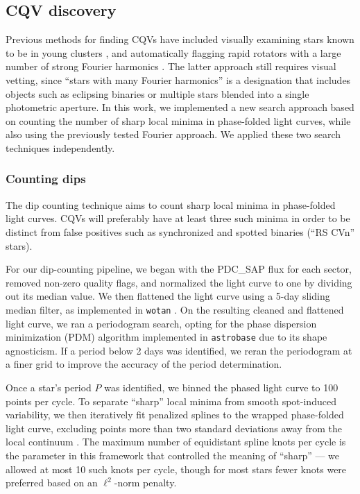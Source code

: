 \documentclass[11pt,twocolumn,tighten]{aastex63}
\begin{document}
\subsection{CQV discovery}
\label{subsec:discoverymethods}

Previous methods for finding CQVs have included visually examining
stars known to be in young clusters
\citep{2016AJ....152..114R,2017AJ....153..152S}, and automatically
flagging rapid rotators with a large number of strong Fourier
harmonics \citep{2019ApJ...876..127Z}.  The latter approach still
requires visual vetting, since ``stars with many Fourier harmonics''
is a designation that includes objects such as eclipsing binaries or
multiple stars blended into a single photometric aperture.  In this
work, we implemented a new search approach based on counting the
number of sharp local minima in phase-folded light curves, while also
using the previously tested Fourier approach.  We applied these two
search techniques independently.   


\subsubsection{Counting dips}
\label{subsec:counting}

The dip counting technique aims to count sharp local minima in
phase-folded light curves.  CQVs will preferably have at least three
such minima in order to be distinct from false positives such as
synchronized and spotted binaries (``RS CVn'' stars). 

For our dip-counting pipeline, we began with the PDC\_SAP flux for
each sector, removed non-zero quality flags, and normalized the light
curve to one by dividing out its median value.  We then flattened the
light curve using a 5-day sliding median filter, as implemented in
\texttt{wotan} \citep{2019AJ....158..143H}.  On the resulting cleaned
and flattened light curve, we ran a periodogram search, opting for the
\citet{1978ApJ...224..953S} phase dispersion minimization (PDM)
algorithm implemented in \texttt{astrobase}
\citep{2021zndo...1011188B} due to its shape agnosticism.  If a period
below 2 days was identified, we reran the periodogram at a finer grid
to improve the accuracy of the period determination.

Once a star's period $P$ was identified, we binned the phased light
curve to 100 points per cycle.  To separate ``sharp'' local minima
from smooth spot-induced variability, we then iteratively fit
penalized splines to the wrapped phase-folded light curve, excluding
points more than two standard deviations away from the local continuum
\citep{2019AJ....158..143H}.  The maximum number of equidistant spline
knots per cycle is the parameter in this framework that controlled the
meaning of ``sharp'' --- we allowed at most 10 such knots per cycle,
though for most stars fewer knots were preferred based on an
$\ell^2$-norm penalty. 
\end{document}

